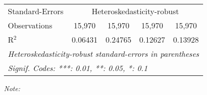 \begin{table}[htbp!]
\begin{adjustbox}{width = 1\textwidth, max height = 0.95\textheight, center}
\begin{threeparttable}[b]
\begin{tabular}{lcccc}
            \midrule 
            Standard-Errors & \multicolumn{4}{c}{Heteroskedasticity-robust} \\ 
            Observations         & 15,970                         & 15,970                         & 15,970                          & 15,970\\  
            R$^2$                & 0.06431                        & 0.24765                        & 0.12627                         & 0.13928\\  
            \midrule \midrule
            \multicolumn{5}{l}{\emph{Heteroskedasticity-robust standard-errors in parentheses}}\\
            \multicolumn{5}{l}{\emph{Signif. Codes: ***: 0.01, **: 0.05, *: 0.1}}\\
         \end{tabular}
         
         \begin{tablenotes}\item \medskip \textit{Note:}
         \end{tablenotes}
      \end{threeparttable}
   \end{adjustbox}
\end{table}



